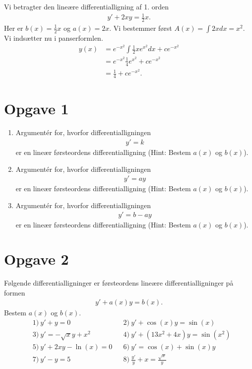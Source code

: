 \begin{exa}
	Vi betragter den lineære differentialligning af 1. orden
	\begin{align*}
		y' + 2xy = \frac{1}{2}x.
	\end{align*}
	Her er $b(x) = \frac{1}{2}x$ og $a(x) = 2x.$
	Vi bestemmer først $A(x) = \int 2x dx = x^2$. 
	Vi indsætter nu i panserformlen.
	\begin{align*}
		y(x) &= e^{-x^2}\int\frac{1}{2}xe^{x^2} dx  + ce^{-x^2}\\
		&=	e^{-x^2}\frac{1}{4}e^{x^2} + ce^{-x^2}\\
		&= \frac{1}{4}+ce^{-x^2}.
	\end{align*}
\end{exa}

\section*{Opgave 1}
\begin{enumerate}[label=\roman*)]
	\item Argumentér for, hvorfor differentialligningen 
	\begin{align*}
		y' = k
	\end{align*}
	er en lineær førsteordens differentialligning (Hint: Bestem $a(x)$ og $b(x)$).
	\item Argumentér for, hvorfor differentialligningen 
	\begin{align*}
		y' = ay
	\end{align*}
	er en lineær førsteordens differentialligning (Hint: Bestem $a(x)$ og $b(x)$).
	\item Argumentér for, hvorfor differentialligningen 
	\begin{align*}
		y' = b-ay
	\end{align*}
	er en lineær førsteordens differentialligning (Hint: Bestem $a(x)$ og $b(x)$).
\end{enumerate}

\section*{Opgave 2}
Følgende differentialligninger er førsteordens lineære differentialligninger på formen
\begin{align*}
	y' + a(x)y=b(x).
\end{align*}
Bestem $a(x)$ og $b(x)$. 
\begin{align*}
	&1) \ y' + y = 0   &&2) \ y' + \cos(x)y = \sin(x)   \\
	&3) \ y' = -\sqrt{x}y+x^2   &&4) \ y' + (13x^2+4x)y = \sin(x^2)  \\
	&5) \ y'+2xy-\ln(x) = 0   &&6) \ y' = \cos(x)+\sin(x)y  \\
	&7) \ y' -y = 5   &&8) \ \frac{y'}{y} +x = \frac{\sqrt{x}}{y}  \\
\end{align*}

